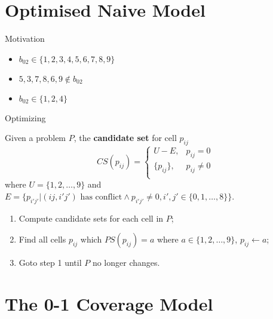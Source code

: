 \documentclass[11pt]{beamer}
\theoremstyle{definition}
\begin{document}
\section{Optimised Naive Model}

\begin{frame}{Motivation}
    \begin{itemize}
        \item $b_{02} \in \{1, 2, 3, 4, 5, 6, 7, 8, 9\}$
        \item<2-> $5, 3, 7, 8, 6, 9 \not\in b_{02}$
        \item<3-> $b_{02} \in \{1, 2, 4\}$
    \end{itemize}
\end{frame}

\begin{frame}{Optimizing}
    \begin{definition}
        Given a problem $P$, the \textbf{candidate set} for cell $p_{ij}$ $$CS(p_{ij}) = \left\{
            \begin{array}{ll}
                U - E, & p_{ij}=0 \\
                \{p_{ij}\}, & p_{ij} \not=0 \\
            \end{array}
        \right.$$ where $U=\{1, 2, \ldots, 9\}$ and $E=\{p_{i'j'} \lvert (ij, i'j') \mbox{ has conflict} \wedge p_{i'j'} \not=0, i', j' \in \{0, 1, \ldots, 8\}\}$.
    \end{definition}
    \pause
    \begin{enumerate}
        \item Compute candidate sets for each cell in $P$;
        \item Find all cells $p_{ij}$ which $PS(p_{ij})={a}$ where $a \in \{1, 2, \ldots, 9\}$, $p_{ij} \leftarrow a$;
        \item Goto step 1 until $P$ no longer changes.
    \end{enumerate}
\end{frame}

\section{The 0-1 Coverage Model}
\end{document}
